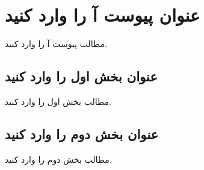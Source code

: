 %
%
%
%
\chapter{
عنوان پیوست آ را وارد کنید
}\label{chapp1}

مطالب پیوست آ را وارد کنید.

\section{
عنوان بخش اول را وارد کنید
}\label{secapp11}

مطالب بخش اول را وارد کنید.

\section{
عنوان بخش دوم را وارد کنید
}\label{secapp12}

مطالب بخش دوم را وارد کنید.

